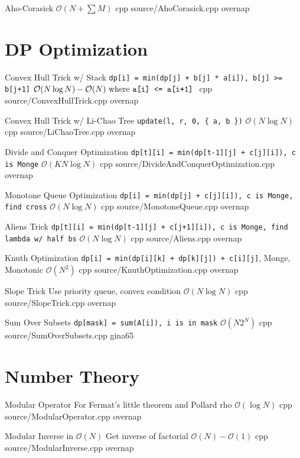\documentclass[landscape, 10pt, a4paper, oneside, twocolumn]{extarticle}
\begin{document}
\Algorithm
{Aho-Corasick}
{}
{$\mathcal{O}(N+\sum{M})$}
{cpp}
{source/AhoCorasick.cpp}
{overnap}


\section{DP Optimization}

\Algorithm
{Convex Hull Trick w/ Stack}
{\texttt{dp[i] = min(dp[j] + b[j] * a[i]), b[j] >= b[j+1]}}
{$\mathcal{O}(N\log{N})-\mathcal{O}(N)\text{ where \texttt{a[i] <= a[i+1]} }$}
{cpp}
{source/ConvexHullTrick.cpp}
{overnap}

\Algorithm
{Convex Hull Trick w/ Li-Chao Tree}
{\texttt{update(l, r, 0, \{ a, b \})}}
{$\mathcal{O}(N\log{N})$}
{cpp}
{source/LiChaoTree.cpp}
{overnap}

\Algorithm
{Divide and Conquer Optimization}
{\texttt{dp[t][i] = min(dp[t-1][j] + c[j][i]), c is Monge}}
{$\mathcal{O}(KN\log{N})$}
{cpp}
{source/DivideAndConquerOptimization.cpp}
{overnap}

\Algorithm
{Monotone Queue Optimization}
{\texttt{dp[i] = min(dp[j] + c[j][i]), c is Monge, find cross}}
{$\mathcal{O}(N\log{N})$}
{cpp}
{source/MonotoneQueue.cpp}
{overnap}

\Algorithm
{Aliens Trick}
{\texttt{dp[t][i] = min(dp[t-1][j] + c[j+1][i]), c is Monge, find lambda w/ half bs}}
{$\mathcal{O}(N\log{N})$}
{cpp}
{source/Aliens.cpp}
{overnap}

\Algorithm
{Knuth Optimization}
{\texttt{dp[i] = min(dp[i][k] + dp[k][j]) + c[i][j]}, Monge, Monotonic}
{$\mathcal{O}(N^2)$}
{cpp}
{source/KnuthOptimization.cpp}
{overnap}

\Algorithm
{Slope Trick}
{Use priority queue, convex condition}
{$\mathcal{O}(N\log{N})$}
{cpp}
{source/SlopeTrick.cpp}
{overnap}

\Algorithm
{Sum Over Subsets}
{\texttt{dp[mask] = sum(A[i]), i is in mask}}
{$\mathcal{O}(N2^N)$}
{cpp}
{source/SumOverSubsets.cpp}
{gina65}


\section{Number Theory}

\Algorithm
{Modular Operator}
{For Fermat's little theorem and Pollard rho}
{$\mathcal{O}(\log{N})$}
{cpp}
{source/ModularOperator.cpp}
{overnap}

\Algorithm
{Modular Inverse in $\mathcal{O}(N)$}
{Get inverse of factorial}
{$\mathcal{O}(N)-\mathcal{O}(1)$}
{cpp}
{source/ModularInverse.cpp}
{overnap}
\end{document}
